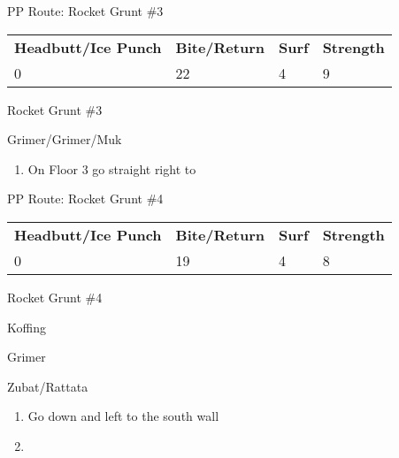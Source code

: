 \begin{paracol}{2}
\begin{misc}{PP Route: Rocket Grunt \#3}
	\varwb
	\begin{tabu} to \textwidth {X[6,c] X[5,c] X[4,c] X[4,c]}
		\textbf{Headbutt/Ice Punch} & \textbf{Bite/Return} & \textbf{Surf} & \textbf{Strength}\\ 
		0 & 22 & 4 & 9
	\end{tabu}
	\varwe
\end{misc}

\switchcolumn
\begin{trainer}{Rocket Grunt \#3}
	\varwb
	\begin{fightSection}{Grimer/Grimer/Muk}
		\item {} \headbutt{} 
	\end{fightSection}
	\varwe
\end{trainer}

\begin{enumerate}[resume]
    \item On Floor 3 go straight right to 
\end{enumerate}

\switchcolumn*
\begin{misc}{PP Route: Rocket Grunt \#4}
	\varwb
	\begin{tabu} to \textwidth {X[6,c] X[5,c] X[4,c] X[4,c]}
		\textbf{Headbutt/Ice Punch} & \textbf{Bite/Return} & \textbf{Surf} & \textbf{Strength}\\ 
		0 & 19 & 4 & 8
	\end{tabu}
	\varwe
\end{misc}

\switchcolumn
\begin{trainer}{Rocket Grunt \#4}
	\varwb
	\begin{fightSection}{Koffing}
		\item {} \bite
	\end{fightSection}
	\begin{fightSection}{Grimer}
		\item {} \strength
	\end{fightSection}
	\begin{fightSection}{Zubat/Rattata}
		\item {} \bite{} 
	\end{fightSection}
	\varwe
\end{trainer}

\begin{enumerate}[resume]
    \item Go down and left to the south wall
    \item {}
\end{enumerate}


\end{paracol}
